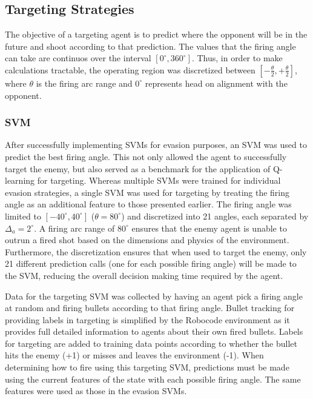 \documentclass{article}
\theoremstyle{plain}
\theoremstyle{definition}
\theoremstyle{remark}
\begin{document}
\subsection*{Targeting Strategies}
The objective of a targeting agent is to predict where the opponent will be in the future and shoot according to that prediction. The values that the firing angle can take are continuos over the interval $[0^{\circ}, 360^{\circ}]$. Thus, in order to make calculations tractable, the operating region was discretized between $[-\frac{\theta}{2}, +\frac{\theta}{2}]$, where $\theta$ is the firing arc range and $0^{\circ}$ represents head on alignment with the opponent.

\subsubsection*{SVM}
After successfully implementing SVMs for evasion purposes, an SVM was used to predict the best firing angle. This not only allowed the agent to successfully target the enemy, but also served as a benchmark for the application of Q-learning for targeting. Whereas multiple SVMs were trained for individual evasion strategies, a single SVM was used for targeting by treating the firing angle as an additional feature to those presented earlier. The firing angle was limited to $[-40^{\circ}, 40^{\circ}]$ ($\theta = 80^{\circ}$) and discretized into 21 angles, each separated by $\Delta_a = 2^{\circ}$. A firing arc range of $80^{\circ}$ ensures that the enemy agent is unable to outrun a fired shot based on the dimensions and physics of the environment. Furthermore, the discretization ensures that when used to target the enemy, only 21 different prediction calls (one for each possible firing angle) will be made to the SVM, reducing the overall decision making time required by the agent.

Data for the targeting SVM was collected by having an agent pick a firing angle at random and firing bullets according to that firing angle. Bullet tracking for providing labels in targeting is simplified by the Robocode environment as it provides full detailed information to agents about their own fired bullets. Labels for targeting are added to training data points according to whether the bullet hits the enemy (+1) or misses and leaves the environment (-1). When determining how to fire using this targeting SVM, predictions must be made using the current features of the state with each possible firing angle. The same features were used as those in the evasion SVMs.
\end{document}
